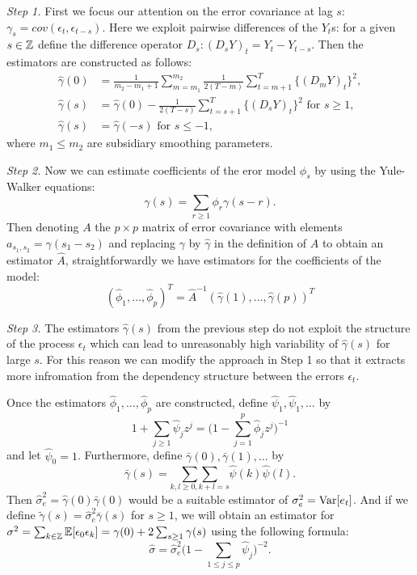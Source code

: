 \documentclass[a4paper,12pt]{article}
\numberwithin{equation}{section}
\begin{document}
\textit{Step 1.}
First we focus our attention on  the error covariance at lag $s$: $\gamma_s = cov(\epsilon_t, \epsilon_{t-s})$. Here we exploit pairwise differences of the $Y_t$s: for a given $s \in \mathbb{Z}$ define the difference operator $D_s: (D_s Y)_t = Y_t - Y_{t-s}$. Then 
the estimators are constructed as follows:
\begin{align*}
\hat{\gamma}(0) &= \frac{1}{m_2-m_1+1}\sum_{m=m_1}^{m_2}\frac{1}{2(T-m)}\sum_{t=m+1}^T\{(D_mY)_t\}^2,\\
\hat{\gamma}(s) &= \hat{\gamma}(0) - \frac{1}{2(T-s)}\sum_{t=s+1}^T \{(D_sY)_t\}^2 \text{ for } s\ge 1,\\
\hat{\gamma}(s) &= \hat{\gamma}(-s) \text{ for } s\le -1,
\end{align*}
where $m_1\le m_2$ are subsidiary smoothing parameters.
\vspace{1pt}


\textit{Step 2.}
Now we can estimate coefficients of the eror model $\phi_s$ by using the Yule-Walker equations:
\[\gamma(s) = \sum_{r\ge 1}\phi_r\gamma(s-r).\]
Then denoting $A$ the $p\times p$ matrix of error covariance with elements $a_{s_1,s_2} = \gamma(s_1-s_2)$ and replacing $\gamma$ by $\hat{\gamma}$ in the definition of $A$ to obtain an estimator $\hat{A}$, straightforwardly we have estimators for the coefficients of the model:
\[(\hat{\phi}_1, \ldots, \hat{\phi}_p)^T = \hat{A}^{-1} (\hat{\gamma}(1), \ldots, \hat{\gamma}(p))^T\]


\textit{Step 3.}
The estimators $\hat{\gamma}(s)$ from the previous step do not exploit the structure of the process $\epsilon_t$ which can lead to unreasonably high variability of $\hat{\gamma}(s)$ for large $s$. For this reason we can modify the approach in Step 1 so that it extracts more infromation from the dependency structure between the errors $\epsilon_t$.

Once the estimators $\hat{\phi}_1, \ldots, \hat{\phi}_p$ are constructed, define $\hat{\psi}_1, \hat{\psi}_1, \ldots$ by 
\[1 + \sum_{j \ge 1} \hat{\psi}_j z^j = \Big(1 - \sum_{j=1}^p \hat{\phi}_j z^j \Big)^{-1} \]
and let $\hat{\psi}_0 = 1$. Furthermore, define $\bar{\gamma}(0), \bar{\gamma}(1), \ldots$ by
\[\bar{\gamma}(s) = \underset{k, l \ge 0, k+l=s}{\sum\sum} \hat{\psi}(k)\hat{\psi}(l).\]
Then $\hat{\sigma}_e^2 = \hat{\gamma}(0)\bar{\gamma}(0)$ would be a suitable estimator of $\sigma^2_e = \textnormal{Var}[e_t]$. And if we define $\tilde{\gamma}(s) = \hat{\sigma}_e^2 \bar{\gamma}(s)$ for $s\ge 1$, we will obtain an estimator for $\sigma^2 = \sum_{k\in \mathbb{Z}} \mathbb{E}[\epsilon_0 \epsilon_k] = \gamma(0) + 2\sum_{s\ge 1}\gamma(s)$ using the following formula:
\[\hat{\sigma} = \hat{\sigma}^2_e \Big( 1-\sum_{1\le j\le p}\hat{\psi}_j\Big)^{-2}.\]
\end{document}

